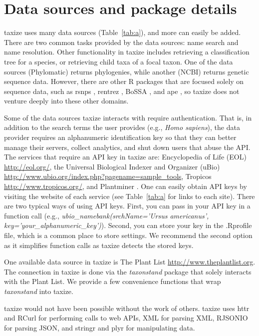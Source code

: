 \documentclass[10pt,a4paper,twocolumn]{article}
\begin{document}
\section*{Data sources and package details}

taxize uses many data sources (Table~\ref{tab:a}), and more can easily be added. There are two common tasks provided by the data sources: name search and name resolution. Other functionality in taxize includes retrieving a classification tree for a species, or retrieving child taxa of a focal taxon. One of the data sources (Phylomatic) returns phylogenies, while another (NCBI) returns genetic sequence data. However, there are other R packages that are focused solely on sequence data, such as rsnps \cite{chamberlain2013}, rentrez \cite{winter2013}, BoSSA \cite{lefeuvre2010}, and ape \cite{paradis2004}, so taxize does not venture deeply into these other domains. 

Some of the data sources taxize interacts with require authentication. That is, in addition to the search terms the user provides (e.g., \emph{Homo sapiens}), the data provider requires an alphanumeric identification key so that they can better manage their servers, collect analytics, and shut down users that abuse the API. The services that require an API key in taxize are: Encyclopedia of Life (EOL) \url{http://eol.org/}, the Universal Biological Indexer and Organizer (uBio) \url{http://www.ubio.org/index.php?pagename=sample_tools}, Tropicos \url{http://www.tropicos.org/}, and Plantminer \cite{carvalho2010plantminer}. One can easily obtain API keys by visiting the website of each service (see Table~\ref{tab:a} for links to each site). There are two typical ways of using API keys. First, you can pass in your API key in a function call (e.g., \emph{ubio\_namebank(srchName='Ursus americanus', key='your\_alphanumeric\_key')}). Second, you can store your key in the .Rprofile file, which is a common place to store settings. We recommend the second option as it simplifies function calls as taxize detects the stored keys.

One available data source in taxize is The Plant List \url{http://www.theplantlist.org}. The connection in taxize is done via the \emph{taxonstand} package \cite{Cayuela_2012} that solely interacts with the Plant List. We provide a few convenience functions that wrap \emph{taxonstand} into taxize.

taxize would not have been possible without the work of others. taxize uses httr \cite{httr} and RCurl \cite{rcurl} for performing calls to web APIs, XML \cite{xml} for parsing XML, RJSONIO \cite{rjsonio} for parsing JSON, and stringr \cite{stringr} and plyr \cite{plyr} for manipulating data.
\end{document}
